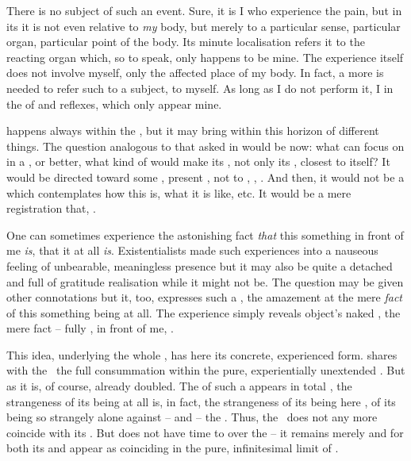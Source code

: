 There is no subject of such an event. Sure, it is I who experience the pain, but
in its  it is not even relative to {\em my} body, but merely to a
particular sense, particular organ, particular point of the body. Its minute
localisation refers it to the reacting organ which, so to speak, only happens to
be mine. The experience itself does not involve myself, only the affected place
of my body.  In fact, a more  is needed to refer such  to a subject, to myself. As long as I do not perform it, I
 in the  of  and {reflexes}, which only
 appear  mine.

\label{refl:A}
 happens always within the \hoa, but it may bring 
within this horizon  of different things. The question 
analogous to that asked in  would be now: 
what can  focus on in a , 
or better, what kind of  would make its , 
not only its , closest to itself? It would be directed toward some 
, present \herenow, not to , 
, . And then, it would not be a 
 which contemplates how this  is, what it 
is like, etc. It would be a mere registration that, .

One can sometimes experience the astonishing fact {\em that} this something in front
of me {\em is}, that it at all {\em is}. Existentialists made such experiences
into a nauseous feeling of unbearable, meaningless presence but it may also be quite
a detached and full of gratitude realisation  while it might not
be. The question  may be given
other connotations but it, too, expresses such a
, the amazement at the mere {\em fact} of this something being at
all.  The experience simply reveals object's naked ,
the mere fact %
 -- fully , in front of me, . 

This idea, underlying the whole , has 
here its concrete, experienced form.   
shares with the \oss\ the full consummation within the pure, 
experientially unextended .
But as  it is, of course, already doubled. The  of
such a  appears in total , the strangeness of
its being at all is, in fact, the strangeness of its being here , of its being so strangely alone against -- and  -- the
. Thus, 
the \rs\ does not any more coincide with its . But 
does not have time to  over the  -- it remains merely
 and for  both its  and 
appear as coinciding in the pure, infinitesimal limit of 
.


